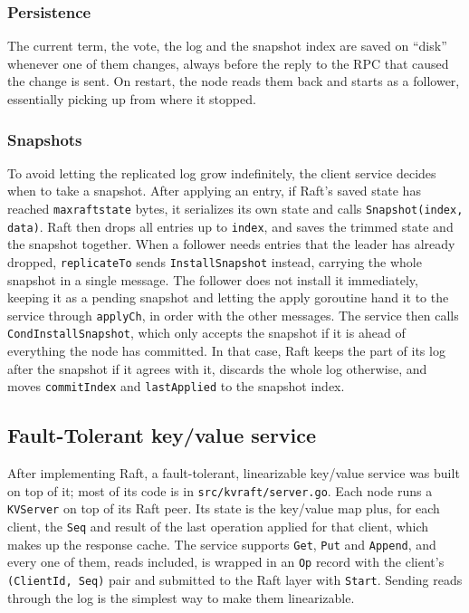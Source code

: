 \documentclass[conference]{IEEEtran}
\begin{document}
\subsubsection{\textbf{Persistence}} The current term, the vote, the log and the snapshot index are saved on ``disk'' whenever one of them changes,
always before the reply to the RPC that caused the change is sent. On restart, the node reads them back and starts as a follower, essentially picking up from where it stopped.

\subsubsection{\textbf{Snapshots}} To avoid letting the replicated log grow indefinitely, the client service decides when to take a snapshot. After applying an entry, if Raft's saved state has reached \texttt{maxraftstate} bytes, it serializes its own state and calls \texttt{Snapshot(index, data)}. Raft then drops all entries up to \texttt{index}, and saves the trimmed state and the snapshot together. When a follower needs entries that the leader has already dropped, \texttt{replicateTo} sends \texttt{InstallSnapshot} instead, carrying the whole snapshot in a single message. The follower does not install it immediately, keeping it as a pending snapshot and letting the apply goroutine hand it to the service through \texttt{applyCh}, in order with the other messages. The service then calls \texttt{CondInstallSnapshot}, which only accepts the snapshot if it is ahead of everything the node has committed. In that case, Raft keeps the part of its log after the snapshot if it agrees with it, discards the whole log otherwise, and moves \texttt{commitIndex} and \texttt{lastApplied} to the snapshot index.

\subsection{Fault-Tolerant key/value service}\label{sec:algs-kv}
After implementing Raft, a fault-tolerant, linearizable key/value service was built on top of it; most of its code is in \texttt{src/kvraft/server.go}. Each node runs a \texttt{KVServer} on top of its Raft peer. Its state is the key/value map plus, for each client, the \texttt{Seq} and result of the last operation applied for that client, which makes up the response cache. The service supports \texttt{Get}, \texttt{Put} and \texttt{Append}, and every one of them, reads included, is wrapped in an \texttt{Op} record with the client's \texttt{(ClientId, Seq)} pair and submitted to the Raft layer with \texttt{Start}. Sending reads through the log is the simplest way to make them linearizable.
\end{document}
